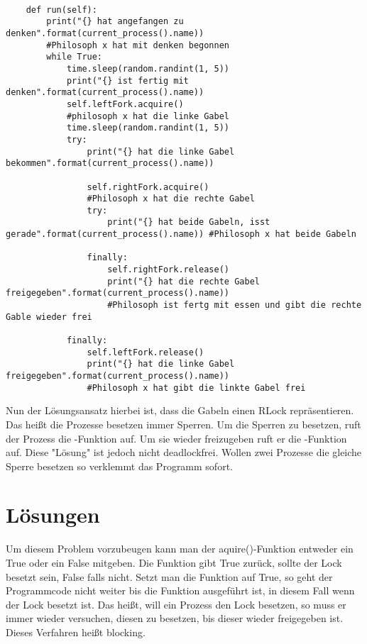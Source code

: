 \begin{lstlisting}[style = Python, label = {erste Lösung}, caption = {erste "naive" Lösung}]

    def run(self):
        print("{} hat angefangen zu denken".format(current_process().name)) 
        #Philosoph x hat mit denken begonnen
        while True:
            time.sleep(random.randint(1, 5))
            print("{} ist fertig mit denken".format(current_process().name))
            self.leftFork.acquire() 
            #philosoph x hat die linke Gabel
            time.sleep(random.randint(1, 5))
            try:
                print("{} hat die linke Gabel bekommen".format(current_process().name))

                self.rightFork.acquire() 
                #Philosoph x hat die rechte Gabel
                try:
                    print("{} hat beide Gabeln, isst gerade".format(current_process().name)) #Philosoph x hat beide Gabeln

                finally:
                    self.rightFork.release()
                    print("{} hat die rechte Gabel freigegeben".format(current_process().name)) 
                    #Philosoph ist fertg mit essen und gibt die rechte Gable wieder frei

            finally:
                self.leftFork.release()
                print("{} hat die linke Gabel freigegeben".format(current_process().name)) 
                #Philosoph x hat gibt die linkte Gabel frei

\end{lstlisting}

Nun der Lösungsansatz hierbei ist, dass die Gabeln einen RLock repräsentieren. Das heißt die Prozesse besetzen immer Sperren. Um die Sperren zu besetzen, ruft der Prozess die -Funktion auf. Um sie wieder freizugeben ruft er die -Funktion auf. Diese "Lösung" ist jedoch nicht deadlockfrei. Wollen zwei Prozesse die gleiche Sperre besetzen so verklemmt das Programm sofort. 

\section{Lösungen}
\label{endlösung}

Um diesem Problem vorzubeugen kann man der aquire()-Funktion entweder ein True oder ein False mitgeben. Die Funktion gibt True zurück, sollte der Lock besetzt sein, False falls nicht. Setzt man die Funktion auf True, so geht der Programmcode nicht weiter bis die Funktion ausgeführt ist, in diesem Fall wenn der Lock besetzt ist. Das heißt, will ein Prozess den Lock besetzen, so muss er immer wieder versuchen, diesen zu besetzen, bis dieser wieder freigegeben ist. Dieses Verfahren heißt blocking. 


